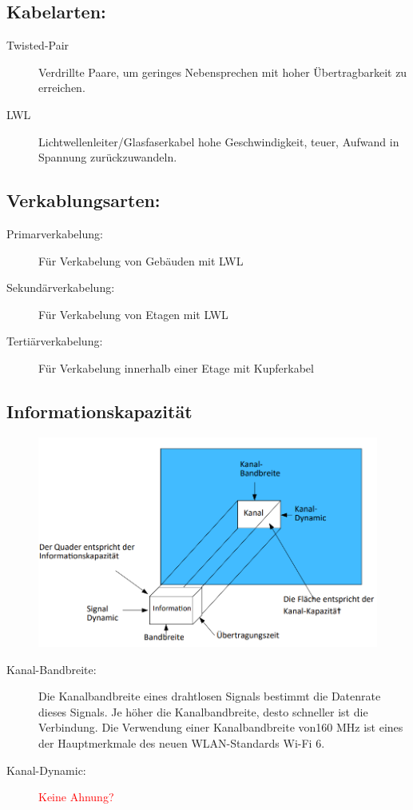 \documentclass[12pt,a4paper]{article}
\begin{document}
		\subsection{Kabelarten:}
		\begin{description}
			\item[Twisted-Pair] Verdrillte Paare, um geringes Nebensprechen mit hoher Übertragbarkeit zu erreichen.
			\item[LWL] Lichtwellenleiter/Glasfaserkabel hohe Geschwindigkeit, teuer, Aufwand in Spannung zurückzuwandeln.
		\end{description}

		\subsection{Verkablungsarten:}
		\begin{description}
			\item[Primarverkabelung: ] Für Verkabelung von Gebäuden mit LWL
			\item[Sekundärverkabelung: ] Für Verkabelung von Etagen mit LWL
			\item[Tertiärverkabelung: ] Für Verkabelung innerhalb einer Etage mit Kupferkabel
		\end{description}
	
		\subsection{Informationskapazität}
		\begin{center}
			\begin{figure}[!h]
				\includegraphics[width=\textwidth]{Bilder/Informationskapazitaet.png}
			\end{figure}
		\end{center}
		\begin{description}
			\item[Kanal-Bandbreite: ] Die Kanalbandbreite eines drahtlosen Signals bestimmt die Datenrate dieses Signals. Je höher die Kanalbandbreite, desto schneller ist die Verbindung. Die Verwendung einer Kanalbandbreite von160 MHz ist eines der Hauptmerkmale des neuen WLAN-Standards Wi-Fi 6.
			\item[Kanal-Dynamic: ] \textcolor{red}{Keine Ahnung?}
		\end{description}
\end{document}
